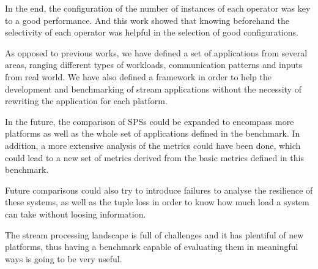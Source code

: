 \documentclass[ppgc,diss,english]{iiufrgs}
\begin{document}
In the end, the configuration of the number of instances of each operator was key to a good performance. And this work showed that knowing beforehand the selectivity of each operator was helpful in the selection of good configurations.

As opposed to previous works, we have defined a set of applications from several areas, ranging different types of workloads, communication patterns and inputs from real world. We have also defined a framework in order to help the development and benchmarking of stream applications without the necessity of rewriting the application for each platform.

In the future, the comparison of SPSs could be expanded to encompass more platforms as well as the whole set of applications defined in the benchmark. In addition, a more extensive analysis of the metrics could have been done, which could lead to a new set of metrics derived from the basic metrics defined in this benchmark.

Future comparisons could also try to introduce failures to analyse the resilience of these systems, as well as the tuple loss in order to know how much load a system can take without loosing information.

The stream processing landscape is full of challenges and it has plentiful of new platforms, thus having a benchmark capable of evaluating them in meaningful ways is going to be very useful.




\end{document}
